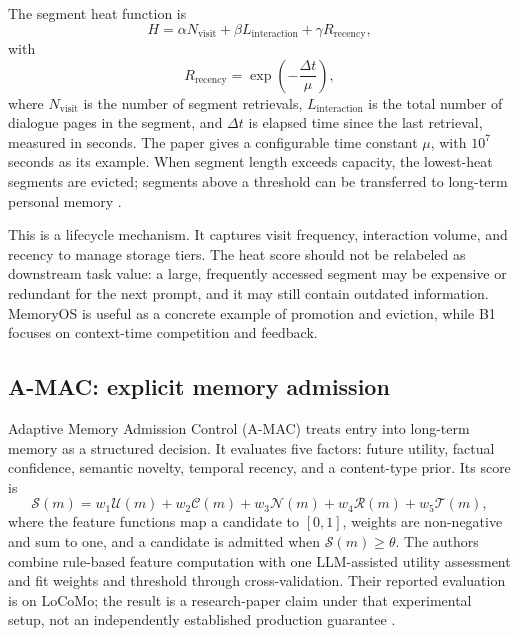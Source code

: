 The segment heat function is
\begin{equation}
  H = \alpha N_{\text{visit}} + \beta L_{\text{interaction}} + \gamma R_{\text{recency}},
  \label{eq:ch12-memoryos-heat}
\end{equation}
with
\begin{equation}
  R_{\text{recency}}=\exp\left(-\frac{\Delta t}{\mu}\right),
  \label{eq:ch12-memoryos-recency}
\end{equation}
where \(N_{\text{visit}}\) is the number of segment retrievals, \(L_{\text{interaction}}\) is the total number of dialogue pages in the segment, and \(\Delta t\) is elapsed time since the last retrieval, measured in seconds. The paper gives a configurable time constant \(\mu\), with \(10^7\) seconds as its example. When segment length exceeds capacity, the lowest-heat segments are evicted; segments above a threshold can be transferred to long-term personal memory \autocite{kang2025memoryos}.

This is a lifecycle mechanism. It captures visit frequency, interaction volume, and recency to manage storage tiers. The heat score should not be relabeled as downstream task value: a large, frequently accessed segment may be expensive or redundant for the next prompt, and it may still contain outdated information. MemoryOS is useful as a concrete example of promotion and eviction, while B1 focuses on context-time competition and feedback.

\subsection{A-MAC: explicit memory admission}
\label{subsec:ch12-amac}

Adaptive Memory Admission Control (A-MAC) treats entry into long-term memory as a structured decision. It evaluates five factors: future utility, factual confidence, semantic novelty, temporal recency, and a content-type prior. Its score is
\begin{equation}
  \mathcal{S}(m)=w_1\mathcal{U}(m)+w_2\mathcal{C}(m)+w_3\mathcal{N}(m)
   +w_4\mathcal{R}(m)+w_5\mathcal{T}(m),
  \label{eq:ch12-amac}
\end{equation}
where the feature functions map a candidate to \([0,1]\), weights are non-negative and sum to one, and a candidate is admitted when \(\mathcal{S}(m)\geq\theta\). The authors combine rule-based feature computation with one LLM-assisted utility assessment and fit weights and threshold through cross-validation. Their reported evaluation is on LoCoMo; the result is a research-paper claim under that experimental setup, not an independently established production guarantee \autocite{zhang2026amac}.

